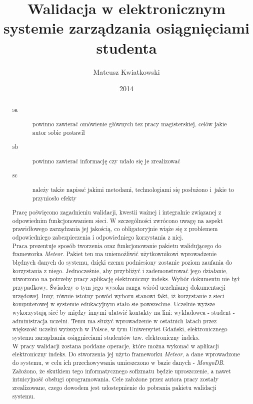\documentclass[brudnopis]{xmgr}
\author   {Mateusz Kwiatkowski}
\title    {Walidacja w elektronicznym systemie zarządzania osiągnięciami studenta}
\date     {2014}
\begin{document}
\begin{abstract}

\begin{description}
\item[sa] \textcolor{sa}{powinno zawierać omówienie głównych 
tez pracy magisterskiej, celów jakie autor sobie postawił} 
\item[sb] \textcolor{sb}{powinno zawierać informację czy udało 
  się je zrealizować}
\item[sc] \textcolor{sc}{należy także napisać jakimi metodami,
  technologiami się posłużono i~jakie to przyniosło efekty}
\end{description}

\indent \indent \textcolor{sa}{Pracę poświęcono zagadnieniu walidacji, kwestii ważnej i integralnie związanej z odpowiednim funkcjonowaniem sieci.
W szczególności zwrócono uwagę na aspekt prawidłowego zarządzania jej jakością, co obligatoryjnie wiąże się z problemem
odpowiedniego zabezpieczenia i odpowiedniego korzystania z niej.}
\\
\indent \textcolor{sa}{Praca prezentuje sposób tworzenia oraz funkcjonowanie pakietu walidującego do frameworka \textit{Meteor}. Pakiet ten
ma uniemożliwić użytkownikowi wprowadzenie błędnych danych do systemu, dzięki czemu podniesiony zostanie poziom zaufania
do korzystania z niego. Jednocześnie, aby przybliżyć i zademonstrować jego działanie, utworzono na potrzeby pracy aplikację elektroniczny indeks.
Wybór dokumentu nie był przypadkowy. Świadczy o tym jego wysoka ranga wśród uczelnianej dokumentacji urzędowej. Inny, równie istotny powód
wyboru stanowi fakt, iż korzystanie z sieci komputerowej w systemie edukacyjnym stało sie powszechne. Uczelnie wyższe wykorzystują sieć by
między innymi ułatwić kontakty na lini: wykładowca - student - administracja uczelni.  Temu ma służyć wprowadzenie w ostatnich latach przez
większość uczelni wyższych w Polsce, w tym Uniwersytet Gdański, elektronicznego systemu zarządzania osiągnieciami studentów
tzw. elektroniczny indeks.}
\\
\indent \textcolor{sc}{W pracy walidacji zostana poddane operacje, które można wykonać w aplikacji elektroniczny indeks. Do stworzenia jej użyto frameworku \textit{Meteor}, a dane wprowadzone do systemu, w celu ich przechowywania umieszczono w bazie danych - \textit{MongoDB}.}
\\
\indent \textcolor{sb}{Założono, że skutkiem tego informatycznego sofizmatu będzie uproszczenie, a nawet intuicyjność obsługi oprogramowania. Cele założone przez autora pracy zostały zrealizowane, czego dowodem jest udostepnienie do pobrania pakietu walidacji systemu.}

\end{abstract}
\end{document}
